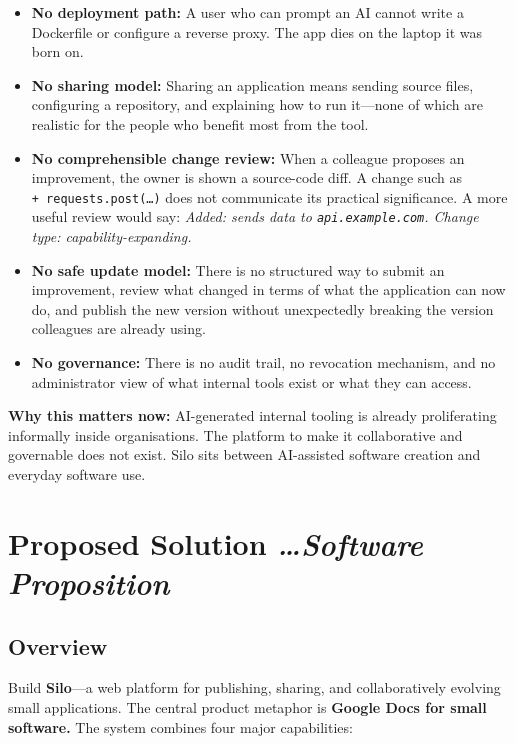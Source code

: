 \documentclass[11pt,a4paper]{article}
\newcommand{\BvrHint}[1]{%
{\normalfont\normalsize\itshape\hfill #1}}
\begin{document}
\begin{itemize}[leftmargin=0.7cm]
  \item \textbf{No deployment path:} A user who can prompt an AI cannot write a
    Dockerfile or configure a reverse proxy. The app dies on the laptop it was born on.
  \item \textbf{No sharing model:} Sharing an application means sending source files,
    configuring a repository, and explaining how to run it---none of which are realistic
    for the people who benefit most from the tool.
  \item \textbf{No comprehensible change review:} When a colleague proposes an
    improvement, the owner is shown a source-code diff.
    A change such as \texttt{+~requests.post(\ldots)} does not communicate its practical
    significance. A more useful review would say:
    \emph{Added: sends data to \texttt{api.example.com}.
    Change type: capability-expanding.}
  \item \textbf{No safe update model:} There is no structured way to submit an
    improvement, review what changed in terms of what the application can now do, and
    publish the new version without unexpectedly breaking the version colleagues are
    already using.
  \item \textbf{No governance:} There is no audit trail, no revocation mechanism, and
    no administrator view of what internal tools exist or what they can access.
\end{itemize}

\textbf{Why this matters now:} AI-generated internal tooling is already proliferating
informally inside organisations. The platform to make it collaborative and governable does
not exist. Silo sits between AI-assisted software creation and everyday software use.

\section{Proposed Solution %
\BvrHint{\ldots Software Proposition}}

\subsection{Overview}

Build \textbf{Silo}---a web platform for publishing, sharing, and collaboratively evolving
small applications. The central product metaphor is \textbf{Google Docs for small
software.} The system combines four major capabilities:
\end{document}
